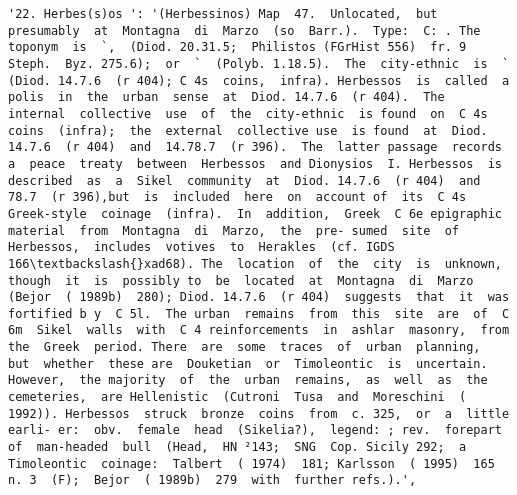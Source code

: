 \documentclass[11pt]{article}
\begin{document}
\begin{Verbatim}[commandchars=\\\{\}]
         '22. Herbes(s)os ': '(Herbessinos) Map  47.  Unlocated,  but presumably  at  Montagna  di  Marzo  (so  Barr.).  Type:  C: . The  toponym  is  `,  (Diod. 20.31.5;  Philistos (FGrHist 556)  fr. 9  Steph.  Byz. 275.6);  or  `  (Polyb. 1.18.5).  The  city-ethnic  is  `  (Diod. 14.7.6  (r 404); C 4s  coins,  infra). Herbessos  is  called  a  polis  in  the  urban  sense  at  Diod. 14.7.6  (r 404).  The  internal  collective  use  of  the  city-ethnic  is found  on  C 4s  coins  (infra);  the  external  collective use  is found  at  Diod. 14.7.6  (r 404)  and  14.78.7  (r 396).  The  latter passage  records  a  peace  treaty  between  Herbessos  and Dionysios  I. Herbessos  is  described  as  a  Sikel  community  at  Diod. 14.7.6  (r 404)  and  78.7  (r 396),but  is  included  here  on  account of  its  C 4s  Greek-style  coinage  (infra).  In  addition,  Greek  C 6e epigraphic  material  from  Montagna  di  Marzo,  the  pre- sumed  site  of  Herbessos,  includes  votives  to  Herakles  (cf. IGDS 166\textbackslash{}xad68). The  location  of  the  city  is  unknown,  though  it  is  possibly to  be  located  at  Montagna  di  Marzo  (Bejor  ( 1989b)  280); Diod. 14.7.6  (r 404)  suggests  that  it  was  fortified b y  C 5l.  The urban  remains  from  this  site  are  of  C 6m  Sikel  walls  with  C 4 reinforcements  in  ashlar  masonry,  from  the  Greek  period. There  are  some  traces  of  urban  planning,  but  whether  these are  Douketian  or  Timoleontic  is  uncertain.  However,  the majority  of  the  urban  remains,  as  well  as  the  cemeteries,  are Hellenistic  (Cutroni  Tusa  and  Moreschini  ( 1992)). Herbessos  struck  bronze  coins  from  c. 325,  or  a  little  earli- er:  obv.  female  head  (Sikelia?),  legend: ; rev.  forepart  of  man-headed  bull  (Head,  HN ²143;  SNG  Cop. Sicily 292;  a  Timoleontic  coinage:  Talbert  ( 1974)  181; Karlsson  ( 1995)  165  n. 3  (F);  Bejor  ( 1989b)  279  with  further refs.).',

\end{Verbatim}
\end{document}
